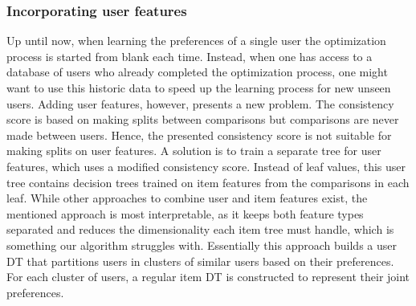 \documentclass{article}
\begin{document}
\subsubsection*{Incorporating user features}\label{appendix:with_user}


Up until now, when learning the preferences of a single user the optimization process is started from blank each time. Instead, when one has access to a database of users who already completed the optimization process, one might want to use this historic data to speed up the learning process for new unseen users. Adding user features, however, presents a new problem. The consistency score is based on making splits between comparisons but comparisons are never made between users. Hence, the presented consistency score is not suitable for making splits on user features. A solution is to train a separate tree for user features, which uses a modified consistency score. Instead of leaf values, this user tree contains decision trees trained on item features from the comparisons in each leaf. While other approaches to combine user and item features exist, the mentioned approach is most interpretable, as it keeps both feature types separated and reduces the dimensionality each item tree must handle, which is something our algorithm struggles with. Essentially this approach builds a user DT that partitions users in clusters of similar users based on their preferences. For each cluster of users, a regular item DT is constructed to represent their joint preferences.
\end{document}
